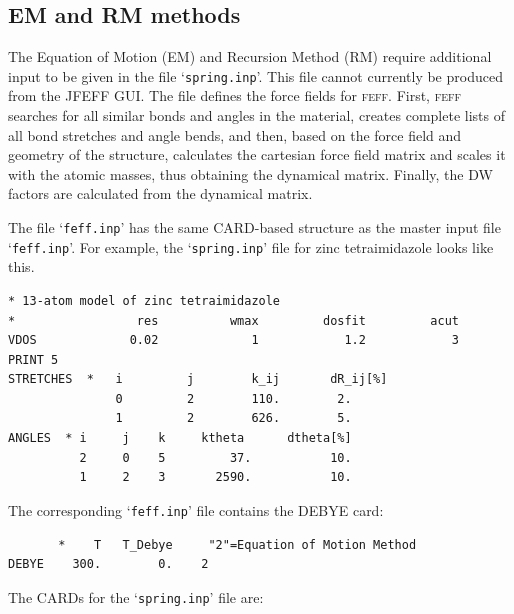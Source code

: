 \documentclass[11pt,oneside]{report} %
\newcommand{\program}[1]{\textsc{#1}}
\newcommand{\feff}{\program{feff}}
\newcommand{\file}[1]{`\texttt{#1}'}
\begin{document}
\subsection{EM and RM methods}
The Equation of Motion (EM) and Recursion Method (RM) require additional input to be given in the file \file{spring.inp}.  This file cannot currently be produced from the JFEFF GUI.
The file defines the force fields for {\feff}.  First, {\feff} searches for all similar bonds and angles in the material, creates complete lists of all bond stretches and angle bends, and then, based on the force field and geometry of the structure, calculates the cartesian force field matrix and scales it with the atomic masses, thus obtaining the dynamical matrix.  Finally, the DW factors are calculated from the dynamical matrix.

The file \file{feff.inp} has the same CARD-based structure as the master input file \file{feff.inp}.  For example, the \file{spring.inp} file for zinc tetraimidazole looks like this.
\begin{verbatim}
* 13-atom model of zinc tetraimidazole
*                 res          wmax         dosfit         acut
VDOS             0.02             1            1.2            3
PRINT 5
STRETCHES  *   i         j        k_ij       dR_ij[%]
               0         2        110.        2.
               1         2        626.        5.
ANGLES  * i     j    k     ktheta      dtheta[%]
          2     0    5         37.           10.
          1     2    3       2590.           10.
\end{verbatim}
The corresponding \file{feff.inp} file contains the DEBYE card:
\begin{verbatim}
       *    T   T_Debye     "2"=Equation of Motion Method
DEBYE    300.        0.    2    
\end{verbatim}

The CARDs for the \file{spring.inp} file are:
\end{document}
